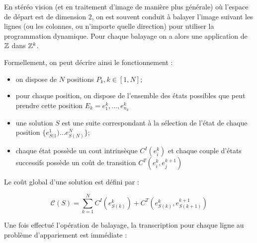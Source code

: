 En st\'er\'eo vision (et en traitement d'image de mani\`ere plus
g\'en\'erale)  o\`u l'espace de d\'epart est de dimension $2$,
on est souvent conduit \`a balayer l'image suivant les
lignes (ou les colonnes, ou n'importe quelle direction)
pour utiliser la programmation dynamique.
Pour chaque balayage on a alors une application de $\ZZ$ dans $\ZZ^k$.


Formellement, on peut d\'ecrire ainsi le fonctionnement :

\begin{itemize}
   \item on dispose de $N$ positions $P_k ,  k \in [1,N]$;

   \item pour chaque position, on dispose de  l'ensemble des
         \'etats possibles que peut prendre cette position
         $E_k ={e^k_1,\dots,e^k_{n_k}} $

   \item une solution $S$ est une suite correspondant \`a la
          s\'election de l'\'etat de chaque position $\{e^1_{S(1}) \dots e^N_{S(N)}\}$;

    \item  chaque \'etat poss\`ede un cout intrins\`eque $C^I(e^k_i)$ et chaque
           couple d'\'etats successifs poss\`ede un co\^ut de transition $C^T(e^k_i,e^{k+1}_j)$
\end{itemize}

Le co\^ut global d'une solution est d\'efini par :

\begin{equation}
  \mathcal C (S) = \sum_{k=1}^N  C^I(e^k_{S(k)}) + C^T(e^k_{S(k)},e^{k+1}_{S(k+1)})
\end{equation}

Une fois effectu\'e l'op\'eration de balayage, la transcription pour chaque
ligne au probl\`eme d'appariement  est imm\'ediate :

